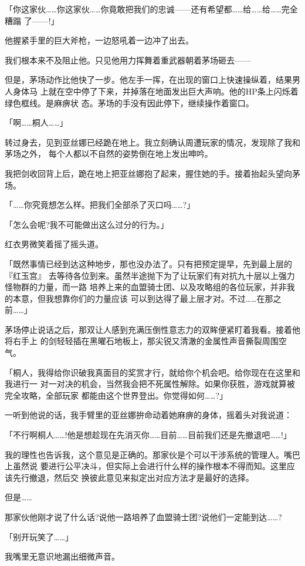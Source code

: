 \documentclass[11pt]{book}
\begin{document}
「你这家伙……你这家伙……你竟敢把我们的忠诚——还有希望都……给……给……完全糟蹋
了——!」

他握紧手里的巨大斧枪，一边怒吼着一边冲了出去。

我们根本来不及阻止他。只见他用力挥舞着重武器朝着茅场砸去——

但是，茅场动作比他快了一步。他左手一挥，在出现的窗口上快速操纵着，结果男人身体马
上就在空中停了下来，并掉落在地面发出巨大声响。他的HP条上闪烁着绿色框线。是麻痹状
态。茅场的手没有因此停下，继续操作着窗口。

「啊……桐人……」

转过身去，见到亚丝娜已经跪在地上。我立刻确认周遭玩家的情况，发现除了我和茅场之外，
每个人都以不自然的姿势倒在地上发出呻吟。

我把剑收回背上后，跪在地上把亚丝娜抱了起来，握住她的手。接着抬起头望向茅场。

「……你究竟想怎么样。把我们全部杀了灭口吗……?」

「怎么会呢?我不可能做出这么过分的行为。」

红衣男微笑着摇了摇头道。

「既然事情已经到达这种地步，那也没办法了。只有把预定提早，先到最上层的『红玉宫』
去等待各位到来。虽然半途抛下为了让玩家们有对抗九十层以上强力怪物群的力量，而一路
培养上来的血盟骑士团、以及攻略组的各位玩家，并非我的本意，但我想靠你们的力量应该
可以到达得了最上层才对。不过……在那之前……」

茅场停止说话之后，那双让人感到充满压倒性意志力的双眸便紧盯着我看。接着他将右手上
的剑轻轻插在黑曜石地板上，那尖锐又清澈的金属性声音撕裂周围空气。

「桐人，我得给你识破我真面目的奖赏才行，就给你个机会吧。给你现在在这里和我进行一
对一对决的机会，当然我会把不死属性解除。如果你获胜，游戏就算被完全攻略，全部玩家
都能由这个世界登出。你觉得如何……?」

一听到他说的话，我手臂里的亚丝娜拚命动着她麻痹的身体，摇着头对我说道：

「不行啊桐人……!他是想趁现在先消灭你……目前……目前我们还是先撤退吧……!」

我的理性也告诉我，这个意见是正确的。那家伙是个可以干涉系统的管理人。嘴巴上虽然说
要进行公平决斗，但实际上会进行什么样的操作根本不得而知。这里应该先行撤退，然后交
换彼此意见来拟定出对应方法才是最好的选择。

但是……

那家伙他刚才说了什么话?说他一路培养了血盟骑士团?说他们一定能到达……?

「别开玩笑了……」

我嘴里无意识地漏出细微声音。
\end{document}
